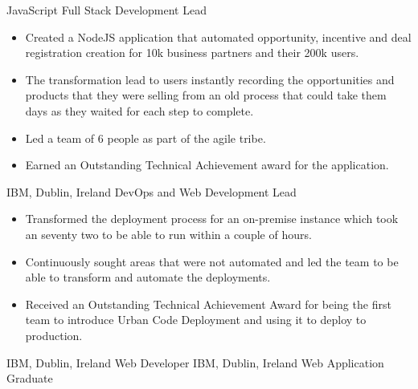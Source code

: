 {JavaScript Full Stack \newline
	Development Lead}
{\begin{itemize}
		\item Created a NodeJS application that automated opportunity, incentive and deal registration creation for 10k business partners and their 200k users.
		\item The transformation lead to users instantly recording the opportunities and products that they were selling from an old process that could take them days as they waited for each step to complete.
		\item Led a team of 6 people as part of the agile tribe.
		\item Earned an Outstanding Technical Achievement award for the application.
	\end{itemize}}
{IBM, Dublin, Ireland}
{DevOps and Web Development \newline
	Lead}
{\begin{itemize}
		\item Transformed the deployment process for an on-premise instance which took an seventy two to be able to run within a couple of hours.
		\item Continuously sought areas that were not automated and led the team to be able to transform and automate the deployments.
		\item Received an Outstanding Technical Achievement Award for being the first team to introduce Urban Code Deployment and using it to deploy to production.
	\end{itemize}}
{IBM, Dublin, Ireland}
{Web Developer}
{}
{IBM, Dublin, Ireland}
{Web Application Graduate}
{}